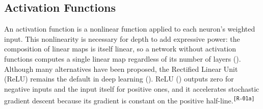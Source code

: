 \documentclass[12pt]{article}
\newcommand{\revID}[1]{\textsuperscript{\scriptsize\texttt{[#1]}}}
\newcommand{\revRepeat}[2]{\textcolor{revTeal}{#2}\revID{#1}}
\begin{document}
\subsection{Activation Functions}
\label{subsec:activation-functions} 



An activation function is a nonlinear function applied to each neuron's weighted input. 
This nonlinearity is necessary for depth to add expressive power: the composition of linear maps is itself linear, 
so a network without activation functions computes a single linear map regardless of its number of layers (\cite{dubey_activation_2022}).
Although many alternatives have been proposed, the Rectified Linear Unit (ReLU) remains the default in deep learning (\cite{ramachandran_searching_2017}).
\revRepeat{R-01a}{ReLU (\cite{nair_rectified_2010}) outputs zero for negative inputs and the input itself for positive ones, and it accelerates stochastic gradient descent because its gradient is constant on the positive half-line.}
\end{document}

